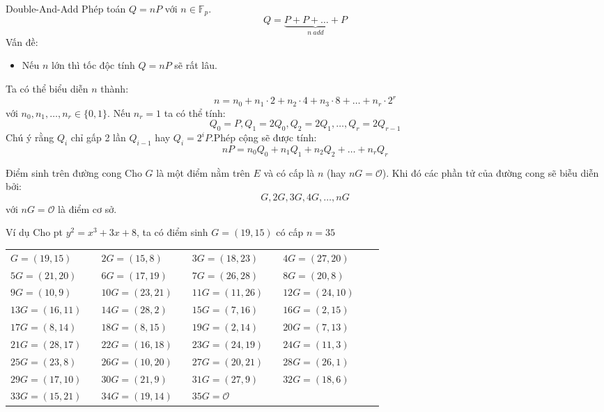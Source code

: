 \documentclass[compress]{beamer}
\begin{document}
\begin{frame}{Double-And-Add}
Phép toán $Q = nP$ với $n \in \mathbb{F}_p$.
\begin{displaymath}
Q = \underbrace{P + P + \ldots + P}_{n \ add}
\end{displaymath}
Vấn đề:
\begin{itemize}
\item Nếu $n$ lớn thì tốc độc tính $Q = nP$ sẽ rất lâu.
\end{itemize}
Ta có thể biểu diễn $n$ thành:
\begin{displaymath}
n = n_0 + n_1 \cdot 2 + n_2 \cdot 4 + n_3 \cdot 8 + \ldots + n_r \cdot 2^r 
\end{displaymath}
với $n_0, n_1, \ldots, n_r \in \{0,1\}$. Nếu $n_r = 1$ ta có thể tính:
\begin{displaymath}
Q_0 = P, Q_1 = 2Q_0, Q_2 = 2Q_1, \ldots, Q_r = 2Q_{r-1}
\end{displaymath}
Chú ý rằng $Q_i$ chỉ gấp 2 lần $Q_{i - 1}$ hay $Q_i = 2^iP$.Phép cộng sẽ được tính:
\begin{displaymath}
nP = n_0Q_0 + n_1Q_1 + n_2Q_2 + \ldots + n_rQ_r
\end{displaymath}
\end{frame}
\begin{frame}{Điểm sinh trên đường cong}
Cho $G$ là một điểm nằm trên $E$ và có cấp là $n$ (hay $nG = \mathcal{O}$). Khi đó các phần tử của đường cong sẽ biễu diễn bởi:
\begin{displaymath}
G, 2G, 3G, 4G, \ldots, nG
\end{displaymath}
với $nG = \mathcal{O}$ là điểm cơ sở.
\end{frame}
\begin{frame}{Ví dụ}
Cho pt $y^2 = x^3 + 3x + 8$, ta có điểm sinh $G = (19, 15)$ có cấp $n = 35$
\small{
\begin{center}
\begin{tabular}{lllllllll}
$G = (19, 15)$ & & $2G = (15, 8)$ & & $3G = (18, 23)$ & & $4G = (27, 20)$ \\
$5G = (21, 20)$ & & $6G = (17, 19)$ & & $7G = (26, 28)$ & & $8G = (20, 8)$ \\
$9G = (10, 9)$ & & $10G = (23, 21)$ & & $11G = (11, 26)$ & & $12G = (24, 10)$ \\
$13G = (16, 11)$ & & $14G = (28, 2)$ & & $15G = (7, 16)$ & & $16G = (2, 15)$ \\
$17G = (8, 14)$ & & $18G = (8, 15)$ & & $19G = (2, 14)$ & & $20G = (7, 13)$ \\
$21G = (28, 17)$ & & $22G = (16, 18)$ & & $23G = (24, 19)$ & & $24G = (11, 3)$ \\
$25G = (23, 8)$ & & $26G = (10, 20)$ & & $27G = (20, 21)$ & & $28G = (26, 1)$ \\
$29G = (17, 10)$ & & $30G = (21, 9)$ & & $31G = (27, 9)$ & & $32G = (18, 6)$ \\
$33G = (15, 21)$ & & $34G = (19, 14)$ & &$35G = \mathcal{O}$ \\
\end{tabular}
\end{center}
}
\end{frame}
\end{document}
